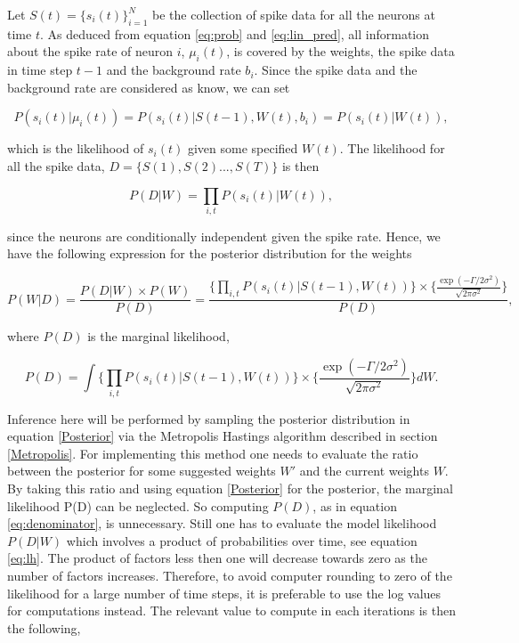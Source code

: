 Let $S(t) = \{s_i(t)\}_{i=1}^N$ be the collection of spike data for all the neurons at time $t$. As deduced from equation \ref{eq:prob} and \ref{eq:lin_pred}, all information about the spike rate of neuron $i$, $\mu_i(t)$, is covered by the weights, the spike data in time step $t-1$ and the background rate $b_i$. Since the spike data and the background rate are considered as know, we can set

\begin{equation}
    P(s_i(t)|\mu_i(t)) = P(s_i(t)|S(t-1),W(t), b_i) = P(s_i(t)|W(t)),
\end{equation}

which is the likelihood of $s_i(t)$ given some specified $W(t)$. The likelihood for all the spike data, $D=\{S(1), S(2)...,S(T)\}$ is then

\begin{equation}
\label{eq:lh}
    P(D|W) = \prod_{i,t} P(s_i(t)|W(t)),
\end{equation}

since the neurons are conditionally independent given the spike rate. Hence, we have the following expression for the posterior distribution for the weights

\begin{equation}
\label{Posterior}
        P(W|D) = \frac{P(D|W)\times P(W)}{P(D)} = \frac{\Big\{\prod_{i,t} P(s_{i}(t)|S(t-1), W(t))\Big\} \times \Big\{\frac{\exp(-\Gamma /2\sigma^2)}{\sqrt{2\pi \sigma^2}}\Big\}}{P(D)}, 
\end{equation}

where $P(D)$ is the marginal likelihood,

\begin{equation}
\label{eq:denominator}
        P(D) = \int \Big\{\prod_{i,t} P(s_{i}(t)|S(t-1), W(t))\Big\} \times \Big\{\frac{\exp(-\Gamma /2\sigma^2)}{\sqrt{2\pi \sigma^2}}\Big\} d{W}.
\end{equation}

Inference here will be performed by sampling the posterior distribution in equation \ref{Posterior} via the Metropolis Hastings algorithm described in section \ref{Metropolis}. For implementing this method one needs to evaluate the  ratio between the posterior for some suggested weights $W'$ and the current weights $W$. By taking this ratio and using equation \ref{Posterior} for the posterior, the marginal likelihood P(D) can be neglected. So computing $P(D)$, as in equation \ref{eq:denominator}, is unnecessary. Still one has to evaluate the model likelihood $P(D|W)$ which involves a product of probabilities over time, see equation \ref{eq:lh}. The product of factors less then one will decrease towards zero as the number of factors increases. Therefore, to avoid computer rounding to zero of the likelihood for a large number of time steps, it is preferable to use the log values for computations instead. The relevant value to compute in each iterations is then the following,

